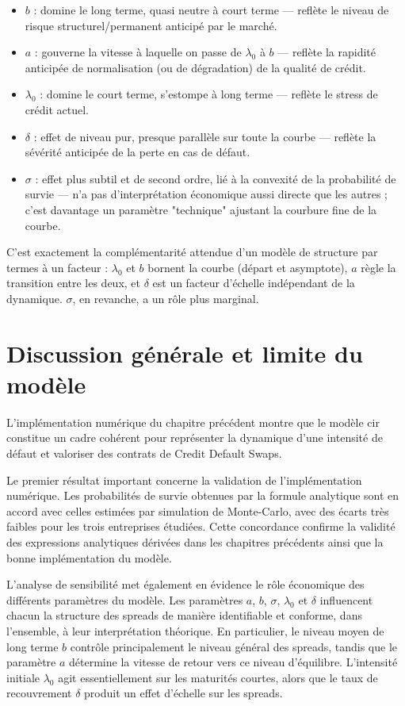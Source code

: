 \begin{itemize}
    \item $b$ : domine le long terme, quasi neutre à court terme — reflète le niveau de risque structurel/permanent anticipé par le marché.
    \item $a$ : gouverne la vitesse à laquelle on passe de $\lambda_0$ à $b$ — reflète la rapidité anticipée de normalisation (ou de dégradation) de la qualité de crédit.
    \item $\lambda_0$ : domine le court terme, s'estompe à long terme — reflète le stress de crédit actuel.
    \item $\delta$ : effet de niveau pur, presque parallèle sur toute la courbe — reflète la sévérité anticipée de la perte en cas de défaut.
    \item $\sigma$ : effet plus subtil et de second ordre, lié à la convexité de la probabilité de survie — n'a pas d'interprétation économique aussi directe que les autres ; c'est davantage un paramètre "technique" ajustant la courbure fine de la courbe.
\end{itemize}


C'est exactement la complémentarité attendue d'un modèle de structure par termes à un facteur : $\lambda_0$ et $b$ bornent la courbe (départ et asymptote), $a$ règle la transition entre les deux, et $\delta$ est un facteur d'échelle indépendant de la dynamique. $\sigma$, en revanche, a un rôle plus marginal.


\chapter{Discussion générale et limite du modèle}

L'implémentation numérique du chapitre précédent montre que le modèle \gls{cir} constitue un cadre cohérent pour représenter la dynamique d'une intensité de défaut et valoriser des contrats de Credit Default Swaps.

Le premier résultat important concerne la validation de l'implémentation numérique. Les probabilités de survie obtenues par la formule analytique sont en accord avec celles estimées par simulation de Monte-Carlo, avec des écarts très faibles pour les trois entreprises étudiées. Cette concordance confirme la validité des expressions analytiques dérivées dans les chapitres précédents ainsi que la bonne implémentation du modèle.

L'analyse de sensibilité met également en évidence le rôle économique des différents paramètres du modèle. Les paramètres $a$, $b$, $\sigma$, $\lambda_0$ et $\delta$ influencent chacun la structure des spreads de manière identifiable et conforme, dans l'ensemble, à leur interprétation théorique. En particulier, le niveau moyen de long terme $b$ contrôle principalement le niveau général des spreads, tandis que le paramètre $a$ détermine la vitesse de retour vers ce niveau d'équilibre. L'intensité initiale $\lambda_0$ agit essentiellement sur les maturités courtes, alors que le taux de recouvrement $\delta$ produit un effet d'échelle sur les spreads.

